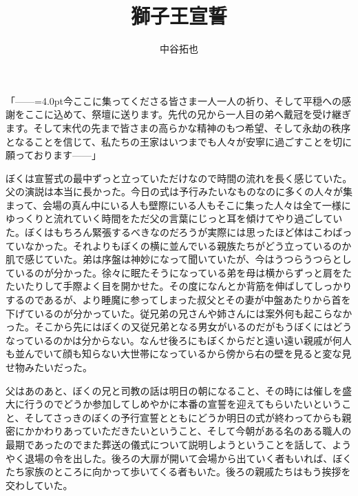 \documentclass[b5j,twoside,twocolumn]{utarticle}
\title{獅子王宣誓}
\author{中谷拓也}
\date{\vspace{-5mm}}
\makeatletter
\def\yakuchu{%
\@ifnextchar[\@xfootnote %
{\stepcounter{yakuchu}%
\protected@xdef\@thefnmark{\theyakuchu}%
\@footnotemark\@footnotetext}}
\makeatother
\begin{document}
\maketitle

\setlength{\footskip}{-2mm}
\chead[]{}
\rhead[獅子王宣誓]{}
\lfoot[]{\thepage{}}
\cfoot[]{}
\rfoot[\thepage{}]{}

\let\yakuchu=\endnote
\renewcommand{\footnoterule}{\noindent\rule{100mm}{0.3mm}\vskip2mm}
\thispagestyle{fancy}

「\tbaselineshift=2.5pt------\tbaselineshift=4.0pt今ここに集ってくださる皆さま一人一人の祈り、そして平穏への感謝をここに込めて、祭壇に送ります。先代の兄から一人目の弟へ戴冠を受け継ぎます。そして末代の先まで皆さまの高らかな精神のもつ希望、そして永劫の秩序となることを信じて、私たちの王家はいつまでも人々が安寧に過ごすことを切に願っております\tbaselineshift=2.5pt------\tbaselineshift=4.0pt」


ぼくは宣誓式の最中ずっと立っていただけなので時間の流れを長く感じていた。父の演説は本当に長かった。今日の式は予行みたいなものなのに多くの人々が集まって、会場の真ん中にいる人も壁際にいる人もそこに集った人々は全て一様にゆっくりと流れていく時間をただ父の言葉にじっと耳を傾けてやり過ごしていた。ぼくはもちろん緊張するべきなのだろうが実際には思ったほど体はこわばっていなかった。それよりもぼくの横に並んでいる親族たちがどう立っているのか肌で感じていた。弟は序盤は神妙になって聞いていたが、今はうつらうつらとしているのが分かった。徐々に眠たそうになっている弟を母は横からずっと肩をたたいたりして手際よく目を開かせた。その度になんとか背筋を伸ばしてしっかりするのであるが、より睡魔に参ってしまった叔父とその妻が中盤あたりから首を下げているのが分かっていた。従兄弟の兄さんや姉さんには案外何も起こらなかった。そこから先にはぼくの又従兄弟となる男女がいるのだがもうぼくにはどうなっているのかは分からない。なんせ後ろにもぼくからだと遠い遠い親戚が何人も並んでいて顔も知らない大世帯になっているから傍から右の壁を見ると変な見せ物みたいだった。


父はあのあと、ぼくの兄と司教の話は明日の朝になること、その時には催しを盛大に行うのでどうか参加してしめやかに本番の宣誓を迎えてもらいたいということ、そしてさっきのぼくの予行宣誓とともにどうか明日の式が終わってからも親密にかかわりあっていただきたいということ、そして今朝がある名のある職人の最期であったのでまた葬送の儀式について説明しようということを話して、ようやく退場の令を出した。後ろの大扉が開いて会場から出ていく者もいれば、ぼくたち家族のところに向かって歩いてくる者もいた。後ろの親戚たちはもう挨拶を交わしていた。
\end{document}
